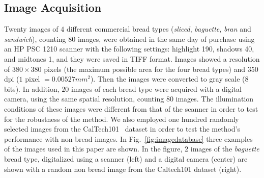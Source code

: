 \documentclass[a4paper,10pt]{article}
\begin{document}
\subsection{Image Acquisition}
Twenty images of $4$ different commercial bread types ({\em sliced}, {\em baguette}, {\em bran} and {\em sandwich}), counting $80$ images, were obtained in the same day of purchase using an HP PSC 1210 scanner with the following settings: highlight 190, shadows 40, and midtones 1, and they were saved in TIFF format. Images showed a resolution of $380 \times 380$ pixels (the maximum possible area for the four bread types) and $350$ dpi ($1$ pixel $= 0.00527 mm^{2}$). Then the images were converted to gray scale ($8$ bits). In addition, $20$ images of each bread type were acquired with a digital camera, using the same spatial resolution, counting $80$ images. The illumination conditions of these images were different from that of the scanner in order to test for the robustness of the method. We also employed one hundred randomly selected images from the CalTech101~\cite{FeiFei04} dataset in order to test the method's performance with non-bread images. In Fig.~\ref{fig:imagedatabase} three examples of the images used in this paper are shown. In the figure, $2$ images of the {\em baguette} bread type, digitalized using a scanner (left) and a digital camera (center) are shown with a random non bread image from the Caltech101 dataset (right).
\end{document}
